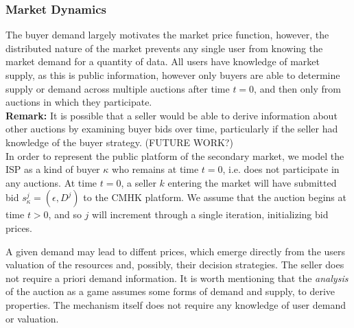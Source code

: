 \documentclass[12pt]{article}
\theoremstyle{definition}
\begin{document}
\begin{multicols}{2}
\subsubsection{Market Dynamics}
The buyer demand largely motivates the market price function, however, the
distributed nature of the market prevents any single user from knowing the
market demand for a quantity of data. All users have knowledge of market
supply, as this is public information, however only buyers
are able to determine supply or demand across multiple auctions after time $t=0$, and then only from auctions
in which they participate. \\
\textbf{Remark:}
It is possible that a seller would be able to derive information about other
auctions by examining buyer bids over time, particularly if the seller had knowledge of the
buyer strategy. (FUTURE WORK?)\\
In order to represent the public platform of the secondary market, we model the ISP as
a kind of buyer $\kappa$ who remains at time $t=0$, i.e. does not participate
in any auctions. At time $t=0$, a seller $k$ entering the market will have submitted bid
$s_\kappa^j =(\epsilon, D^j)$ to the CMHK platform. We assume that the auction
begins at time $t>0$, and so $j$ will increment through a single iteration,
initializing bid prices.

A given demand may lead to diffent prices, which emerge directly from the users valuation
of the resources and, possibly, their decision strategies. The seller does not
require a priori demand information.
It is worth mentioning that the \emph{analysis} of the auction as
a game assumes some forms of demand and supply, to derive properties.
The mechanism itself does not require any knowledge of user demand or
valuation. 
\iffalse
The ISP overage
charge inducing an upper bound on the sellers' reserve prices implies that
supply will always be greater than demand, thereby reducing the sellers'
influence on market dynamics.
\fi


\end{multicols}
\end{document}
